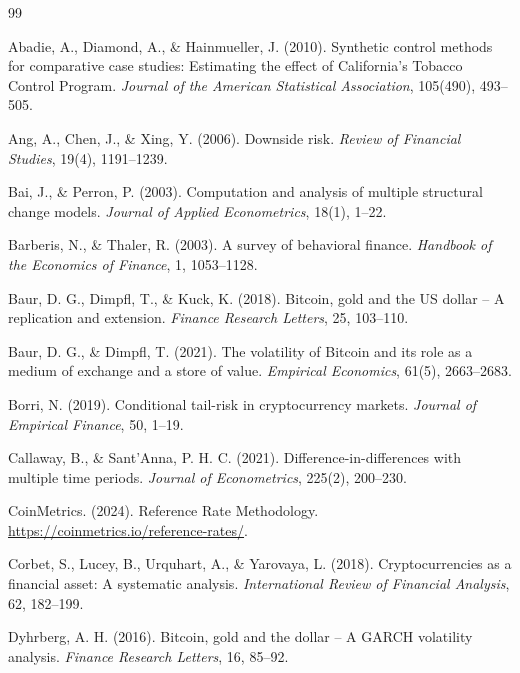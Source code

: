 \documentclass[11pt,a4paper]{article}
\begin{document}

\begin{thebibliography}{99}

 Abadie, A., Diamond, A., \& Hainmueller, J. (2010). Synthetic control methods for comparative case studies: Estimating the effect of California's Tobacco Control Program. \emph{Journal of the American Statistical Association}, 105(490), 493--505.

 Ang, A., Chen, J., \& Xing, Y. (2006). Downside risk. \emph{Review of Financial Studies}, 19(4), 1191--1239.

 Bai, J., \& Perron, P. (2003). Computation and analysis of multiple structural change models. \emph{Journal of Applied Econometrics}, 18(1), 1--22.

 Barberis, N., \& Thaler, R. (2003). A survey of behavioral finance. \emph{Handbook of the Economics of Finance}, 1, 1053--1128.

 Baur, D. G., Dimpfl, T., \& Kuck, K. (2018). Bitcoin, gold and the US dollar -- A replication and extension. \emph{Finance Research Letters}, 25, 103--110.

 Baur, D. G., \& Dimpfl, T. (2021). The volatility of Bitcoin and its role as a medium of exchange and a store of value. \emph{Empirical Economics}, 61(5), 2663--2683.

 Borri, N. (2019). Conditional tail-risk in cryptocurrency markets. \emph{Journal of Empirical Finance}, 50, 1--19.

 Callaway, B., \& Sant'Anna, P. H. C. (2021). Difference-in-differences with multiple time periods. \emph{Journal of Econometrics}, 225(2), 200--230.

 CoinMetrics. (2024). Reference Rate Methodology. \url{https://coinmetrics.io/reference-rates/}.

 Corbet, S., Lucey, B., Urquhart, A., \& Yarovaya, L. (2018). Cryptocurrencies as a financial asset: A systematic analysis. \emph{International Review of Financial Analysis}, 62, 182--199.

 Dyhrberg, A. H. (2016). Bitcoin, gold and the dollar -- A GARCH volatility analysis. \emph{Finance Research Letters}, 16, 85--92.


\end{thebibliography}
\end{document}
